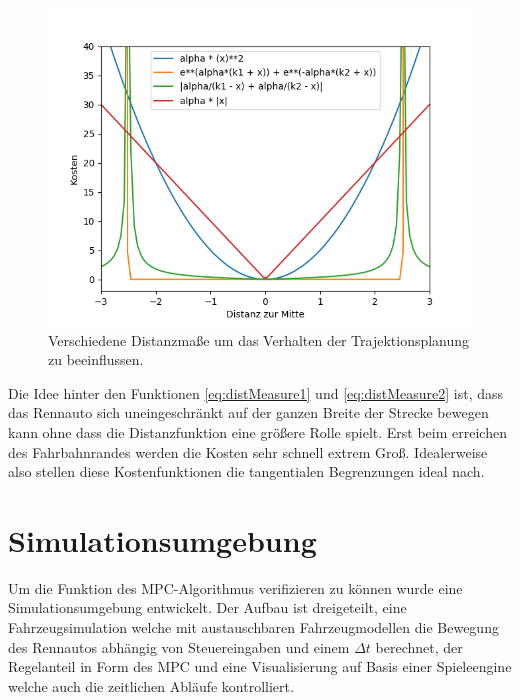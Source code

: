 \documentclass{like}
\begin{document}
\begin{figure}[ht!]
	\centering
	\includegraphics[width=350pt]{Abbildungen/elastic_cost.png}
	\caption{Verschiedene Distanzmaße um das Verhalten der Trajektionsplanung zu beeinflussen.}
	\label{fig:elasticCost}
\end{figure}

Die Idee hinter den Funktionen \ref{eq:distMeasure1} und \ref{eq:distMeasure2} ist, dass das Rennauto sich uneingeschränkt auf der ganzen Breite der Strecke bewegen kann ohne dass die Distanzfunktion eine größere Rolle spielt. Erst beim erreichen des Fahrbahnrandes werden die Kosten sehr schnell extrem Groß. Idealerweise also stellen diese Kostenfunktionen die tangentialen Begrenzungen ideal nach. 



\chapter{Simulationsumgebung}
Um die Funktion des \ac{MPC}-Algorithmus verifizieren zu können wurde eine Simulationsumgebung entwickelt. Der Aufbau ist dreigeteilt, eine Fahrzeugsimulation welche mit austauschbaren Fahrzeugmodellen die Bewegung des Rennautos abhängig von Steuereingaben und einem $\Delta t$ berechnet, der Regelanteil in Form des \ac{MPC} und eine Visualisierung auf Basis einer Spieleengine welche auch die zeitlichen Abläufe kontrolliert. 
\end{document}
